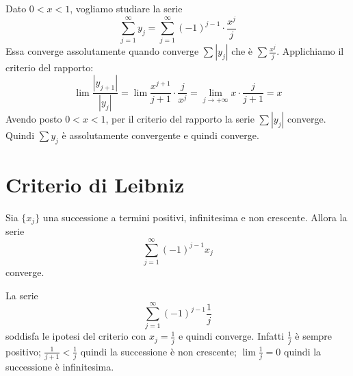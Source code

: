 \begin{example}
Dato $0<x<1$, vogliamo studiare la serie
\begin{equation*}
\sum_{j=1}^\infty y_j = \sum_{j=1}^\infty (-1)^{j-1} \cdot \frac{x^j}{j}
\end{equation*}
Essa converge assolutamente quando converge $\sum |y_j|$ che è $\sum \frac{x^j}{j}$. Applichiamo il criterio del rapporto:
\begin{equation*}
\lim \frac{|y_{j+1}|}{|y_j|} = \lim \frac{x^{j+1}}{j+1} \cdot \frac{j}{x^j} = \lim_{j \to +\infty} x \cdot \frac{j}{j+1} = x
\end{equation*}
Avendo posto $0<x<1$, per il criterio del rapporto la serie $\sum |y_j|$ converge. Quindi $\sum y_j$ è assolutamente convergente e quindi converge.
\end{example}

\section{Criterio di Leibniz}

\begin{theorem}
Sia $\{x_j\}$ una successione a termini positivi, infinitesima e non crescente. Allora la serie
\begin{equation*}
\sum_{j=1}^\infty (-1)^{j-1} x_j
\end{equation*}
converge.
\end{theorem}

\begin{example}
La serie
\begin{equation*}
\sum_{j=1}^\infty (-1)^{j-1} \frac{1}{j}
\end{equation*}
soddisfa le ipotesi del criterio con $x_j = \frac{1}{j}$ e quindi converge. Infatti $\frac{1}{j}$ è sempre positivo; $\frac{1}{j+1} < \frac{1}{j}$ quindi la successione è non crescente; $\lim \frac{1}{j} = 0$ quindi la successione è infinitesima.
\end{example}

